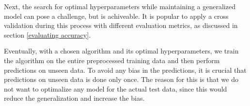 Next, the search for optimal hyperparameters while maintaining a generalized model can pose a challenge, but is achiveable. It is popular to apply a cross validation during this process with different evaluation metrics, as discussed in section \ref{evaluating accuracy}.

Eventually, with a chosen algorithm and its optimal hyperparameters, we train the algorithm on the entire preprocessed training data and then perform predictions on unseen data. To avoid any bias in the predictions, it is crucial that predictions on unseen data is done only once. The reason for this is that we do not want to optimalize any model for the actual test data, since this would reduce the generalization and increase the bias.







